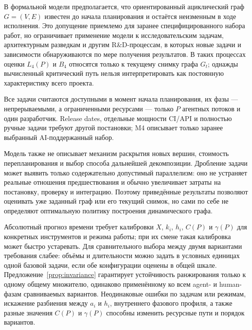 В формальной модели предполагается, что ориентированный ациклический граф
$G=(V,E)$ известен до начала планирования и остаётся неизменным в ходе
исполнения. Это допущение приемлемо для заранее специфицированного набора работ,
но ограничивает применение модели к исследовательским задачам, архитектурным
разведкам и другим R\&D-процессам, в которых новые задачи и зависимости
обнаруживаются по мере получения результатов. В таких процессах оценки
$L_4(P)$ и $B_4$ относятся только к текущему снимку графа $G_t$; однажды
вычисленный критический путь нельзя интерпретировать как постоянную
характеристику всего проекта.

Все задачи считаются доступными в момент начала планирования, их фазы ---
непрерываемыми, а ограниченными ресурсами --- только $P$ агентных потоков и один
разработчик. Release dates, отдельные мощности CI/API и полностью ручные задачи
требуют другой постановки; M4 описывает только заранее выбранный
AI-поддержанный набор.

Модель также не описывает механизм раскрытия новых вершин, стоимость
перепланирования и выбор способа дальнейшей декомпозиции. Дробление задачи может
выявить только содержательно допустимый параллелизм: оно не устраняет реальные
отношения предшествования и обычно увеличивает затраты на постановку, проверку
и интеграцию. Поэтому приведённые результаты позволяют оценивать уже заданный
граф или его текущий снимок, но сами по себе не определяют оптимальную политику
построения динамического графа.

Абсолютный прогноз времени требует калибровки $X$, $k_i$, $h_i$, $C(P)$ и
$\gamma(P)$ для конкретных инструментов и режима работы; при их смене такая
калибровка может быстро устаревать. Для сравнительного выбора между двумя
вариантами требования слабее: объёмы и длительности можно задать в условных
единицах одной базовой задачи, если обе конфигурации оценены в общей шкале.
Предложение~\ref{prop:invariance} гарантирует устойчивость ранжирования только
к одному общему множителю, одинаково применённому ко всем agent- и human-фазам
сравниваемых вариантов. Неодинаковые ошибки по задачам или режимам, искажение
разбиения между $a_i$ и $h_i$, внутреннего фазового профиля, а также разные
значения $C(P)$ и $\gamma(P)$ способны изменить ресурсные пути и порядок
вариантов.
